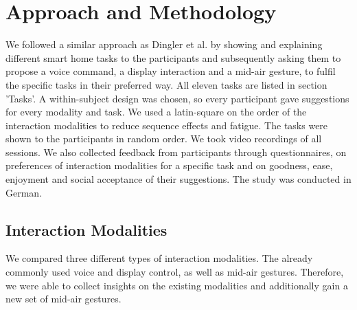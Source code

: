 \documentclass[sigchi]{acmart}
\begin{document}
	
	\section{Approach and Methodology}
	We followed a similar approach as Dingler et al. \cite{Dingler.2018} by showing and explaining different smart home tasks to the participants and subsequently asking them to propose a voice command, a display interaction and a mid-air gesture, to fulfil the specific tasks in their preferred way. All eleven tasks are listed in section 'Tasks'. A within-subject design was chosen, so every participant gave suggestions for every modality and task. We used a latin-square on the order of the interaction modalities to reduce sequence effects \cite{.2017} and fatigue. The tasks were shown to the participants in  random order. We took video recordings of all sessions. We also collected feedback from participants through questionnaires, on preferences of interaction modalities for a specific task and on goodness, ease, enjoyment and social acceptance of their suggestions. The study was conducted in German.
	
	\subsection{Interaction Modalities}
	We compared three different types of interaction modalities. The already commonly used voice and display control, as well as mid-air gestures. Therefore, we were able to collect insights on the existing modalities and additionally gain a new set of mid-air gestures.
	
\end{document}
